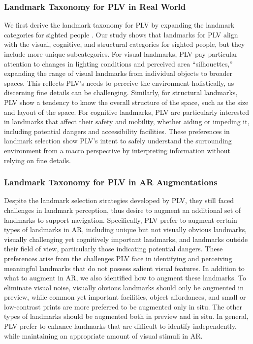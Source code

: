 \subsubsection{Landmark Taxonomy for PLV in Real World}
We first derive the landmark taxonomy for PLV by expanding the landmark categories for sighted people \cite{saha2019closing}. %
Our study shows that landmarks for PLV align with the visual, cognitive, and structural categories for sighted people, but they include more unique subcategories. For visual landmarks, PLV pay particular attention to changes in lighting conditions and perceived area “silhouettes,” expanding the range of visual landmarks from individual objects to broader spaces. This reflects PLV's needs to perceive the environment holistically, as discerning fine details can be challenging. Similarly, for structural landmarks, PLV show a tendency to know the overall structure of the space, such as the size and layout of the space. For cognitive landmarks, PLV are particularly interested in landmarks that affect their safety and mobility, whether aiding or impeding it, including potential dangers and accessibility facilities. These preferences in landmark selection show PLV's intent to safely understand the surrounding environment from a macro perspective by interpreting information without relying on fine details. %

\subsubsection{Landmark Taxonomy for PLV in AR Augmentations}
Despite the landmark selection strategies developed by PLV, they still faced challenges in landmark perception, thus desire to augment an additional set of landmarks to support navigation. 
Specifically, PLV prefer to augment certain types of landmarks in AR, including unique but not visually obvious landmarks, visually challenging yet cognitively important landmarks, and landmarks outside their field of view, particularly those indicating potential dangers. These preferences arise from the challenges PLV face in identifying and perceiving meaningful landmarks that do not possess salient visual features. In addition to what to augment in AR, we also identified how to augment these landmarks. To eliminate visual noise, visually obvious landmarks should only be augmented in preview, while common yet important facilities, object affordances, and small or low-contrast prints are more preferred to be augmented only in situ. The other types of landmarks should be augmented both in preview and in situ. In general, PLV prefer to enhance landmarks that are difficult to identify independently, while maintaining an appropriate amount of visual stimuli in AR.



